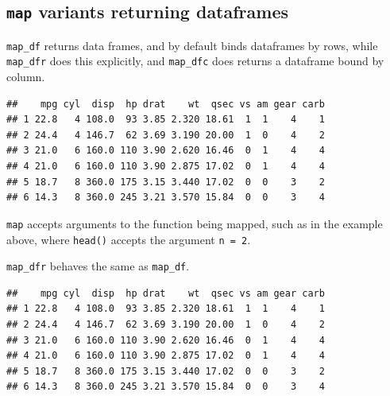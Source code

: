 \documentclass[]{book}
\newenvironment{Shaded}{}{}
\newcommand{\CommentTok}[1]{\textcolor[rgb]{0.38,0.63,0.69}{\textit{#1}}}
\newcommand{\DataTypeTok}[1]{\textcolor[rgb]{0.56,0.13,0.00}{#1}}
\newcommand{\DecValTok}[1]{\textcolor[rgb]{0.25,0.63,0.44}{#1}}
\newcommand{\KeywordTok}[1]{\textcolor[rgb]{0.00,0.44,0.13}{\textbf{#1}}}
\newcommand{\NormalTok}[1]{#1}
\newcommand{\OperatorTok}[1]{\textcolor[rgb]{0.40,0.40,0.40}{#1}}
\newcommand{\StringTok}[1]{\textcolor[rgb]{0.25,0.44,0.63}{#1}}
\begin{document}
\hypertarget{map-variants-returning-dataframes}{%
\subsection{\texorpdfstring{\texttt{map} variants returning dataframes}{map variants returning dataframes}}\label{map-variants-returning-dataframes}}

\texttt{map\_df} returns data frames, and by default binds dataframes by rows, while \texttt{map\_dfr} does this explicitly, and \texttt{map\_dfc} does returns a dataframe bound by column.

\begin{Shaded}
\end{Shaded}

\begin{verbatim}
##    mpg cyl  disp  hp drat    wt  qsec vs am gear carb
## 1 22.8   4 108.0  93 3.85 2.320 18.61  1  1    4    1
## 2 24.4   4 146.7  62 3.69 3.190 20.00  1  0    4    2
## 3 21.0   6 160.0 110 3.90 2.620 16.46  0  1    4    4
## 4 21.0   6 160.0 110 3.90 2.875 17.02  0  1    4    4
## 5 18.7   8 360.0 175 3.15 3.440 17.02  0  0    3    2
## 6 14.3   8 360.0 245 3.21 3.570 15.84  0  0    3    4
\end{verbatim}

\texttt{map} accepts arguments to the function being mapped, such as in the example above, where \texttt{head()} accepts the argument \texttt{n\ =\ 2}.

\texttt{map\_dfr} behaves the same as \texttt{map\_df}.

\begin{Shaded}
\end{Shaded}

\begin{verbatim}
##    mpg cyl  disp  hp drat    wt  qsec vs am gear carb
## 1 22.8   4 108.0  93 3.85 2.320 18.61  1  1    4    1
## 2 24.4   4 146.7  62 3.69 3.190 20.00  1  0    4    2
## 3 21.0   6 160.0 110 3.90 2.620 16.46  0  1    4    4
## 4 21.0   6 160.0 110 3.90 2.875 17.02  0  1    4    4
## 5 18.7   8 360.0 175 3.15 3.440 17.02  0  0    3    2
## 6 14.3   8 360.0 245 3.21 3.570 15.84  0  0    3    4
\end{verbatim}
\end{document}
